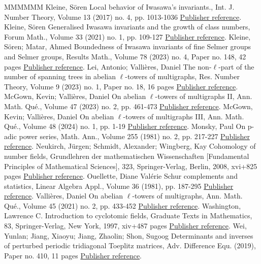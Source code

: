 \begin{thebibliography}{MMMMMM}
 Kleine, Sören Local behavior of Iwasawa’s invariants., Int. J. Number Theory, Volume 13 (2017) no. 4, pp. 1013-1036 \href{https://alco.centre-mersenne.org/articles/10.5802/alco.366/#local_beh}{Publisher reference}.
 Kleine, Sören Generalised Iwasawa invariants and the growth of class numbers, Forum Math., Volume 33 (2021) no. 1, pp. 109-127 \href{https://alco.centre-mersenne.org/articles/10.5802/alco.366/#local_max}{Publisher reference}.
 Kleine, Sören; Matar, Ahmed Boundedness of Iwasawa invariants of fine Selmer groups and Selmer groups, Results Math., Volume 78 (2023) no. 4, Paper no. 148, 42 pages \href{https://alco.centre-mersenne.org/articles/10.5802/alco.366/#kleine-matar}{Publisher reference}.
 Lei, Antonio; Vallières, Daniel The non-\(\ell\)-part of the number of spanning trees in abelian \(\ell\)-towers of multigraphs, Res. Number Theory, Volume 9 (2023) no. 1, Paper no. 18, 16 pages \href{https://alco.centre-mersenne.org/articles/10.5802/alco.366/#vallieres-lei}{Publisher reference}.
 McGown, Kevin; Vallières, Daniel On abelian \(\ell\)-towers of multigraphs II, Ann. Math. Qué., Volume 47 (2023) no. 2, pp. 461-473 \href{https://alco.centre-mersenne.org/articles/10.5802/alco.366/#vallieres2}{Publisher reference}.
 McGown, Kevin; Vallières, Daniel On abelian \(\ell\)-towers of multigraphs III, Ann. Math. Qué., Volume 48 (2024) no. 1, pp. 1-19 \href{https://alco.centre-mersenne.org/articles/10.5802/alco.366/#vallieres3}{Publisher reference}.
 Monsky, Paul On p-adic power series, Math. Ann., Volume 255 (1981) no. 2, pp. 217-227 \href{https://alco.centre-mersenne.org/articles/10.5802/alco.366/#monsky}{Publisher reference}.
 Neukirch, Jürgen; Schmidt, Alexander; Wingberg, Kay Cohomology of number fields, Grundlehren der mathematischen Wissenschaften [Fundamental Principles of Mathematical Sciences], 323, Springer-Verlag, Berlin, 2008, xvi+825 pages \href{https://alco.centre-mersenne.org/articles/10.5802/alco.366/#nsw}{Publisher reference}.
 Ouellette, Diane Valérie Schur complements and statistics, Linear Algebra Appl., Volume 36 (1981), pp. 187-295 \href{https://alco.centre-mersenne.org/articles/10.5802/alco.366/#Ouellette}{Publisher reference}.
 Vallières, Daniel On abelian \(\ell\)-towers of multigraphs, Ann. Math. Qué., Volume 45 (2021) no. 2, pp. 433-452 \href{https://alco.centre-mersenne.org/articles/10.5802/alco.366/#vallieres1}{Publisher reference}.
 Washington, Lawrence C. Introduction to cyclotomic fields, Graduate Texts in Mathematics, 83, Springer-Verlag, New York, 1997, xiv+487 pages \href{https://alco.centre-mersenne.org/articles/10.5802/alco.366/#wash}{Publisher reference}.
 Wei, Yunlan; Jiang, Xiaoyu; Jiang, Zhaolin; Shon, Sugoog Determinants and inverses of perturbed periodic tridiagonal Toeplitz matrices, Adv. Difference Equ. (2019), Paper no. 410, 11 pages \href{https://alco.centre-mersenne.org/articles/10.5802/alco.366/#wei}{Publisher reference}.
\end{thebibliography}
